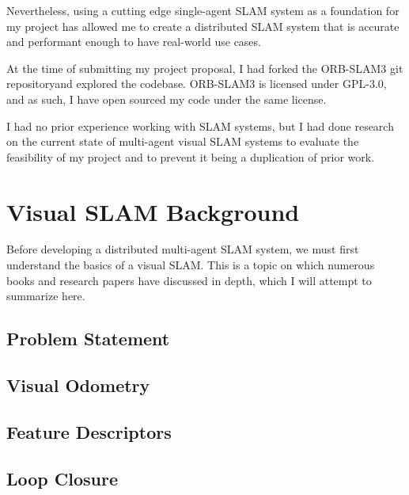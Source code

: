 Nevertheless, using a cutting edge single-agent SLAM system as a foundation for my project has allowed me to create a distributed SLAM system that is accurate and performant enough to have real-world use cases.

At the time of submitting my project proposal, I had forked the ORB-SLAM3 \autocite{ORBSLAM3_TRO} git repository\footnotemark[1] and explored the codebase. ORB-SLAM3 is licensed under GPL-3.0, and as such, I have open sourced my code under the same license\footnotemark[2].


I had no prior experience working with SLAM systems, but I had done research on the current state of multi-agent visual SLAM systems to evaluate the feasibility of my project and to prevent it being a duplication of prior work.

\section{Visual SLAM Background}
\label{sec:visual-slam-background}
Before developing a distributed multi-agent SLAM system, we must first understand the basics of a visual SLAM. This is a topic on which numerous books \autocite{gao2021introduction} and research papers \autocite{durrant2006simultaneous} have discussed in depth, which I will attempt to summarize here.

\subsection{Problem Statement}
\label{sec:visual-slam-problem-statement}


\subsection{Visual Odometry}
\label{sec:visual-slam-visual-odometry}


\subsection{Feature Descriptors}
\label{sec:visual-slam-feature-descriptors}


\subsection{Loop Closure}
\label{sec:visual-slam-loop-closure}



